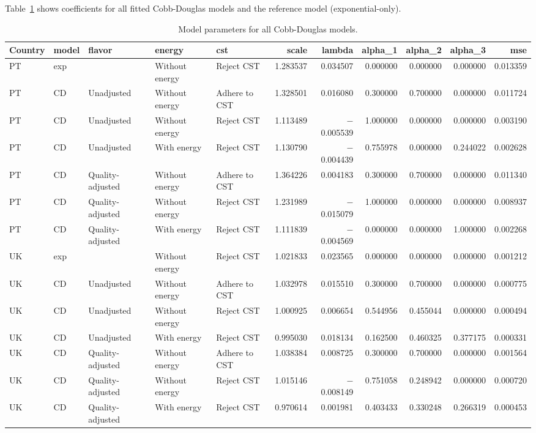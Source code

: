 \documentclass[preprint,authoryear,12pt]{elsarticle}\usepackage[]{graphicx}\usepackage[]{color}
\begin{document}
Table~\ref{tab:CD_coeffs} shows coefficients for all fitted Cobb-Douglas models
and the reference model (exponential-only).
%
\begin{table}[ht]
\centering
\caption{Model parameters for all Cobb-Douglas models.} 
\label{tab:CD_coeffs}
{\tiny
\begin{tabular}{lllllrrrrrr}
  \hline
Country & model & flavor & energy & cst & scale & lambda & alpha\_1 & alpha\_2 & alpha\_3 & mse \\ 
  \hline
PT & exp &  & Without energy & Reject CST & 1.283537 & 0.034507 & 0.000000 & 0.000000 & 0.000000 & 0.013359 \\ 
  PT & CD & Unadjusted & Without energy & Adhere to CST & 1.328501 & 0.016080 & 0.300000 & 0.700000 & 0.000000 & 0.011724 \\ 
  PT & CD & Unadjusted & Without energy & Reject CST & 1.113489 & $-$0.005539 & 1.000000 & 0.000000 & 0.000000 & 0.003190 \\ 
  PT & CD & Unadjusted & With energy & Reject CST & 1.130790 & $-$0.004439 & 0.755978 & 0.000000 & 0.244022 & 0.002628 \\ 
  PT & CD & Quality-adjusted & Without energy & Adhere to CST & 1.364226 & 0.004183 & 0.300000 & 0.700000 & 0.000000 & 0.011340 \\ 
  PT & CD & Quality-adjusted & Without energy & Reject CST & 1.231989 & $-$0.015079 & 1.000000 & 0.000000 & 0.000000 & 0.008937 \\ 
  PT & CD & Quality-adjusted & With energy & Reject CST & 1.111839 & $-$0.004569 & 0.000000 & 0.000000 & 1.000000 & 0.002268 \\ 
  UK & exp &  & Without energy & Reject CST & 1.021833 & 0.023565 & 0.000000 & 0.000000 & 0.000000 & 0.001212 \\ 
  UK & CD & Unadjusted & Without energy & Adhere to CST & 1.032978 & 0.015510 & 0.300000 & 0.700000 & 0.000000 & 0.000775 \\ 
  UK & CD & Unadjusted & Without energy & Reject CST & 1.000925 & 0.006654 & 0.544956 & 0.455044 & 0.000000 & 0.000494 \\ 
  UK & CD & Unadjusted & With energy & Reject CST & 0.995030 & 0.018134 & 0.162500 & 0.460325 & 0.377175 & 0.000331 \\ 
  UK & CD & Quality-adjusted & Without energy & Adhere to CST & 1.038384 & 0.008725 & 0.300000 & 0.700000 & 0.000000 & 0.001564 \\ 
  UK & CD & Quality-adjusted & Without energy & Reject CST & 1.015146 & $-$0.008149 & 0.751058 & 0.248942 & 0.000000 & 0.000720 \\ 
  UK & CD & Quality-adjusted & With energy & Reject CST & 0.970614 & 0.001981 & 0.403433 & 0.330248 & 0.266319 & 0.000453 \\ 
   \hline
\end{tabular}
}
\end{table}
\end{document}

